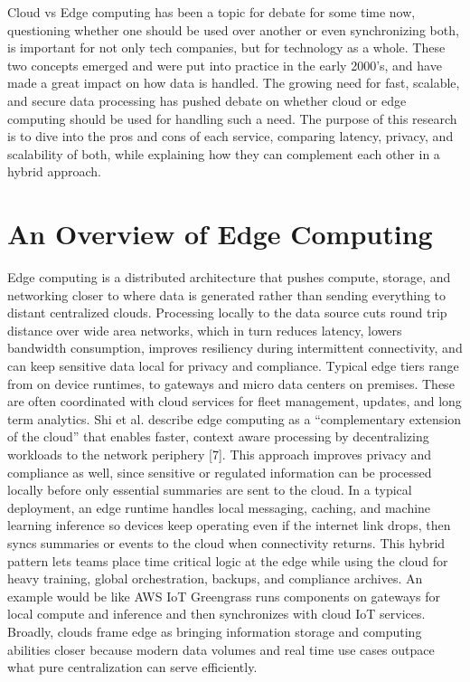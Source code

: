 \documentclass[conference]{IEEEtran}
\begin{document}
Cloud vs Edge computing has been a topic for debate for some time now, questioning whether one should be used over another or even synchronizing both, is important for not only tech companies, but for technology as a whole. These two concepts emerged and were put into practice in the early 2000’s, and have made a great impact on how data is handled. The growing need for fast, scalable, and secure data processing has pushed debate on whether cloud or edge computing should be used for handling such a need. The purpose of this research is to dive into the pros and cons of each service, comparing latency, privacy, and scalability of both, while explaining how they can complement each other in a hybrid approach. 

\section{An Overview of Edge Computing}

Edge computing is a distributed architecture that pushes compute, storage, and networking closer to where data is generated rather than sending everything to distant centralized clouds. Processing locally to the data source cuts round trip distance over wide area networks, which in turn reduces latency, lowers bandwidth consumption, improves resiliency during intermittent connectivity, and can keep sensitive data local for privacy and compliance. Typical edge tiers range from on device runtimes, to gateways and micro data centers on premises. These are often coordinated with cloud services for fleet management, updates, and long term analytics. Shi et al. describe edge computing as a “complementary extension of the cloud” that enables faster, context aware processing by decentralizing workloads to the network periphery [7]. This approach improves privacy and compliance as well, since sensitive or regulated information can be processed locally before only essential summaries are sent to the cloud.
In a typical deployment, an edge runtime handles local messaging, caching, and machine learning inference so devices keep operating even if the internet link drops, then syncs summaries or events to the cloud when connectivity returns. This hybrid pattern lets teams place time critical logic at the edge while using the cloud for heavy training, global orchestration, backups, and compliance archives. An example would be like AWS IoT Greengrass runs components on gateways for local compute and inference and then synchronizes with cloud IoT services. Broadly, clouds frame edge as bringing information storage and computing abilities closer because modern data volumes and real time use cases outpace what pure centralization can serve efficiently.
\end{document}

